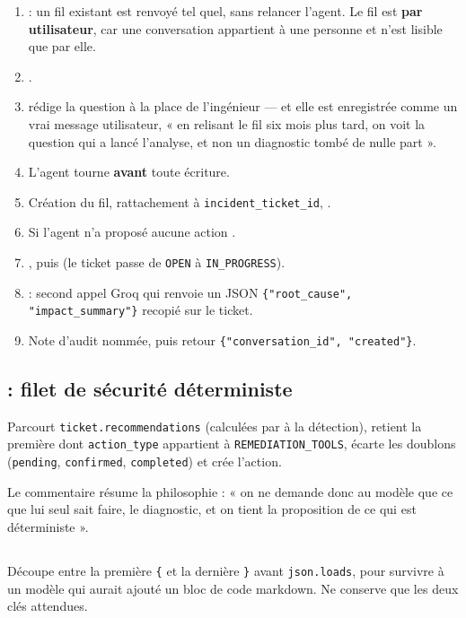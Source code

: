 \begin{enumerate}
  \item {} : un fil existant est
  renvoyé tel quel, sans relancer l'agent. Le fil est \textbf{par utilisateur},
  car une conversation appartient à une personne et n'est lisible que par elle.
  \item {} \arrowto{} .
  \item {} rédige la question à la place de
  l'ingénieur --- et elle est enregistrée comme un vrai message utilisateur,
  « en relisant le fil six mois plus tard, on voit la question qui a lancé
  l'analyse, et non un diagnostic tombé de nulle part ».
  \item L'agent tourne \textbf{avant} toute écriture.
  \item Création du fil, rattachement à \texttt{incident\_ticket\_id},
  .
  \item Si l'agent n'a proposé aucune action \arrowto{} .
  \item {}, puis  (le ticket passe de
  \texttt{OPEN} à \texttt{IN\_PROGRESS}).
  \item {} : second appel Groq qui renvoie un JSON
  \texttt{\{"root\_cause", "impact\_summary"\}} recopié sur le ticket.
  \item Note d'audit nommée, puis retour \texttt{\{"conversation\_id",
  "created"\}}.
\end{enumerate}

\subsection*{ : filet de sécurité déterministe}
Parcourt \texttt{ticket.recommendations} (calculées par
 à la détection), retient la première dont
\texttt{action\_type} appartient à \texttt{REMEDIATION\_TOOLS}, écarte les
doublons (\texttt{pending}, \texttt{confirmed}, \texttt{completed}) et crée
l'action.

\begin{infobox}
Le commentaire résume la philosophie : « on ne demande donc au modèle que ce que
lui seul sait faire, le diagnostic, et on tient la proposition de ce qui est
déterministe ».
\end{infobox}

\subsection*{}
Découpe entre la première \texttt{\{} et la dernière \texttt{\}} avant
\texttt{json.loads}, pour survivre à un modèle qui aurait ajouté un bloc de code
markdown. Ne conserve que les deux clés attendues.

